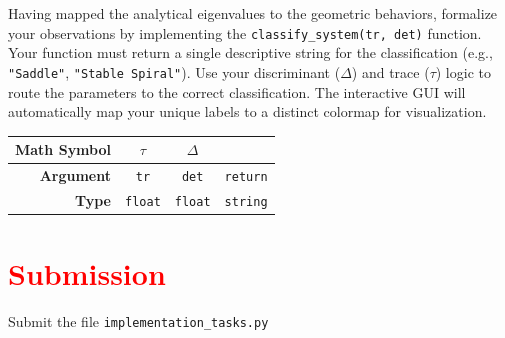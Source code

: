 \documentclass[11pt]{article}
\begin{document}
Having mapped the analytical eigenvalues to the geometric behaviors, formalize your observations by implementing the \lstinline|classify_system(tr, det)| function. Your function must return a single descriptive string for the classification (e.g., \lstinline|"Saddle"|, \lstinline|"Stable Spiral"|). Use your discriminant ($\Delta$) and trace ($\tau$) logic to route the parameters to the correct classification. The interactive GUI will automatically map your unique labels to a distinct colormap for visualization.
\begin{center}
\renewcommand{\arraystretch}{2.0}
\begin{tabular}{r | c | c | c}
\toprule
\textbf{Math Symbol} & $\tau$ & $\Delta$ &  \\ \midrule
\textbf{Argument} & \lstinline|tr| & \lstinline|det| & \lstinline|return| \\ \midrule
\textbf{Type} & \lstinline|float| & \lstinline|float| & \lstinline|string|\\
\bottomrule
\end{tabular}
\end{center}


\section*{\textcolor{red}{Submission}}

Submit the file \texttt{implementation\_tasks.py}
\end{document}
